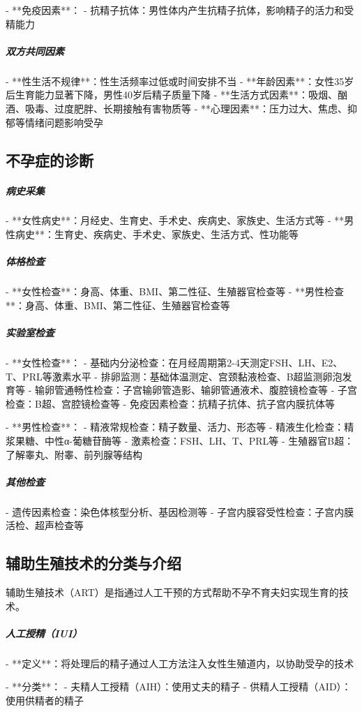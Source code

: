 \begin{enumerate}
- **免疫因素**：
  - 抗精子抗体：男性体内产生抗精子抗体，影响精子的活力和受精能力

\subparagraph{双方共同因素}

- **性生活不规律**：性生活频率过低或时间安排不当
- **年龄因素**：女性35岁后生育能力显著下降，男性40岁后精子质量下降
- **生活方式因素**：吸烟、酗酒、吸毒、过度肥胖、长期接触有害物质等
- **心理因素**：压力过大、焦虑、抑郁等情绪问题影响受孕

\subsection{不孕症的诊断}

\subparagraph{病史采集}

- **女性病史**：月经史、生育史、手术史、疾病史、家族史、生活方式等
- **男性病史**：生育史、疾病史、手术史、家族史、生活方式、性功能等

\subparagraph{体格检查}

- **女性检查**：身高、体重、BMI、第二性征、生殖器官检查等
- **男性检查**：身高、体重、BMI、第二性征、生殖器官检查等

\subparagraph{实验室检查}

- **女性检查**：
  - 基础内分泌检查：在月经周期第2-4天测定FSH、LH、E2、T、PRL等激素水平
  - 排卵监测：基础体温测定、宫颈黏液检查、B超监测卵泡发育等
  - 输卵管通畅性检查：子宫输卵管造影、输卵管通液术、腹腔镜检查等
  - 子宫检查：B超、宫腔镜检查等
  - 免疫因素检查：抗精子抗体、抗子宫内膜抗体等

- **男性检查**：
  - 精液常规检查：精子数量、活力、形态等
  - 精液生化检查：精浆果糖、中性α-葡糖苷酶等
  - 激素检查：FSH、LH、T、PRL等
  - 生殖器官B超：了解睾丸、附睾、前列腺等结构

\subparagraph{其他检查}

- 遗传因素检查：染色体核型分析、基因检测等
- 子宫内膜容受性检查：子宫内膜活检、超声检查等

\subsection{辅助生殖技术的分类与介绍}

辅助生殖技术（ART）是指通过人工干预的方式帮助不孕不育夫妇实现生育的技术。

\subparagraph{人工授精（IUI）}

- **定义**：将处理后的精子通过人工方法注入女性生殖道内，以协助受孕的技术

- **分类**：
  - 夫精人工授精（AIH）：使用丈夫的精子
  - 供精人工授精（AID）：使用供精者的精子


\end{enumerate}

